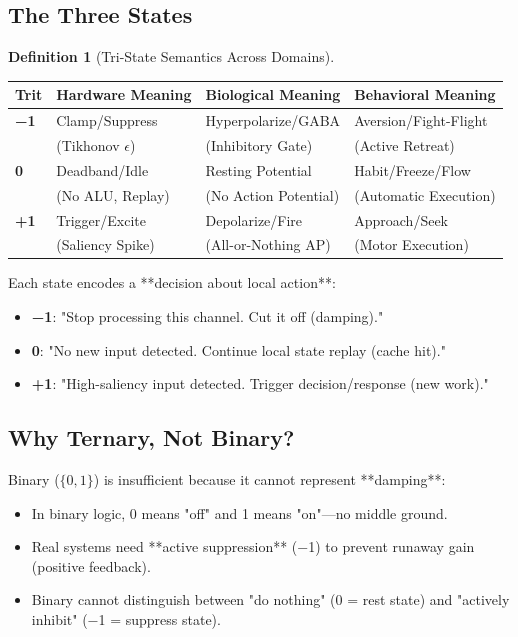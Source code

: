 \documentclass[11pt,oneside]{article}
\theoremstyle{definition}
\newtheorem{definition}[theorem]{Definition}
\begin{document}
\subsection{The Three States}

\begin{definition}[Tri-State Semantics Across Domains]

\begin{center}
\begin{tabular}{llll}
\toprule
Trit & Hardware Meaning & Biological Meaning & Behavioral Meaning \\
\midrule
\textbf{−1} & Clamp/Suppress & Hyperpolarize/GABA & Aversion/Fight-Flight \\
& (Tikhonov $\epsilon$) & (Inhibitory Gate) & (Active Retreat) \\
\midrule
\textbf{0} & Deadband/Idle & Resting Potential & Habit/Freeze/Flow \\
& (No ALU, Replay) & (No Action Potential) & (Automatic Execution) \\
\midrule
\textbf{+1} & Trigger/Excite & Depolarize/Fire & Approach/Seek \\
& (Saliency Spike) & (All-or-Nothing AP) & (Motor Execution) \\
\toprule
\end{tabular}
\end{center}

Each state encodes a **decision about local action**:

\begin{itemize}
  \item \textbf{−1}: "Stop processing this channel. Cut it off (damping)."
  \item \textbf{0}: "No new input detected. Continue local state replay (cache hit)."
  \item \textbf{+1}: "High-saliency input detected. Trigger decision/response (new work)."
\end{itemize}
\end{definition}

\subsection{Why Ternary, Not Binary?}

Binary ($\{0, 1\}$) is insufficient because it cannot represent **damping**:

\begin{itemize}
  \item In binary logic, 0 means "off" and 1 means "on"—no middle ground.
  \item Real systems need **active suppression** (−1) to prevent runaway gain (positive feedback).
  \item Binary cannot distinguish between "do nothing" (0 = rest state) and "actively inhibit" (−1 = suppress state).
\end{itemize}
\end{document}
